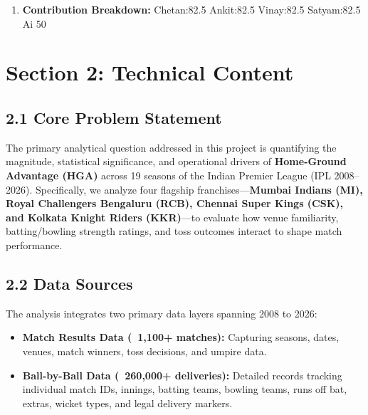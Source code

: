 \documentclass[11pt,a4paper]{article}
\begin{document}
\begin{enumerate}
    \begin{itemize}
        \item Chetan: \texttt{Chetandoescode7781} (Initial Commit: Oct 21,2026)
        \item Ankit: CryingMan-sys(Initial Commit: Nov 4,2026)
        \item Vinay: pvsvinay07-tech(Initial Commit: Nov 2,2026)
        \item Satyam:  satyasatyamiitb-dotcom(Initial Commit: Nov 3,2026)
    \end{itemize}
    \item \textbf{Contribution Breakdown:}  Chetan:82.5  Ankit:82.5  Vinay:82.5  Satyam:82.5 Ai 50
\end{enumerate}

\newpage

\section*{Section 2: Technical Content}

\subsection*{2.1 Core Problem Statement}
The primary analytical question addressed in this project is quantifying the magnitude, statistical significance, and operational drivers of \textbf{Home-Ground Advantage (HGA)} across 19 seasons of the Indian Premier League (IPL 2008--2026). Specifically, we analyze four flagship franchises—\textbf{Mumbai Indians (MI), Royal Challengers Bengaluru (RCB), Chennai Super Kings (CSK), and Kolkata Knight Riders (KKR)}—to evaluate how venue familiarity, batting/bowling strength ratings, and toss outcomes interact to shape match performance.

\subsection*{2.2 Data Sources}
The analysis integrates two primary data layers spanning 2008 to 2026:
\begin{itemize}
    \item \textbf{Match Results Data (~1,100+ matches):} Capturing seasons, dates, venues, match winners, toss decisions, and umpire data.
    \item \textbf{Ball-by-Ball Data (~260,000+ deliveries):} Detailed records tracking individual match IDs, innings, batting teams, bowling teams, runs off bat, extras, wicket types, and legal delivery markers.
\end{itemize}
\end{document}
